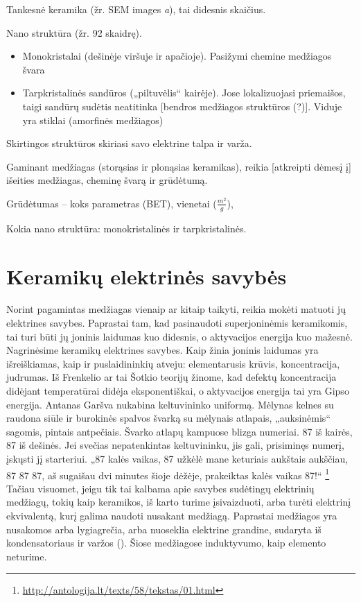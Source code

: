 Tankesnė keramika (žr. SEM images \textit{a}), tai didesnis skaičius.

Nano struktūra (žr. 92 skaidrę).
\begin{itemize}
  \item Monokristalai (dešinėje viršuje ir apačioje). Pasižymi chemine
    medžiagos švara
  \item Tarpkristalinės sandūros („piltuvėlis“ kairėje).
    Jose lokalizuojasi priemaišos, taigi sandūrų sudėtis neatitinka
    [bendros medžiagos struktūros (?)]. Viduje yra stiklai (amorfinės
    medžiagos)
\end{itemize}
Skirtingos struktūros skiriasi savo elektrine talpa ir varža.

\begin{remember}
  \item Gaminant medžiagas (storąsias ir plonąsias keramikas), reikia
    [atkreipti dėmesį į] išeities medžiagas, cheminę švarą ir grūdėtumą.
  \item Grūdėtumas – koks parametras (BET), vienetai ($\frac{m^2}{g}$),
  \item Kokia nano struktūra: monokristalinės ir tarpkristalinės.
\end{remember}

\section{Keramikų elektrinės savybės}


Norint pagamintas medžiagas vienaip ar kitaip taikyti, reikia mokėti
matuoti jų elektrines savybes. Paprastai tam, kad pasinaudoti
superjoninėmis keramikomis, tai turi būti jų joninis laidumas
kuo didesnis, o aktyvacijos energija kuo mažesnė. Nagrinėsime keramikų
elektrines savybes. Kaip žinia joninis laidumas yra išreiškiamas,
kaip ir puslaidininkių atveju: elementarusis krūvis, koncentracija,
judrumas. Iš Frenkelio ar tai Šotkio teorijų žinome, kad defektų
koncentracija didėjant temperatūrai didėja eksponentiškai, o aktyvacijos
energija tai yra Gipso energija.
  {Antanas Garšva nukabina keltuvininko uniformą. Mėlynas kelnes su
  raudona siūle ir burokinės spalvos švarką su mėlynais atlapais,
  „auksinėmis“ sagomis, pintais antpečiais. Švarko atlapų kampuose
  blizga numeriai. 87 iš kairės, 87 iš dešinės. Jei svečias
  nepatenkintas keltuvininku, jis gali, prisiminęs numerį, įskųsti jį
  starteriui. „87 kalės vaikas, 87 užkėlė mane keturiais aukštais
  aukščiau, 87 87 87, aš sugaišau dvi minutes šioje dėžėje,
  prakeiktas kalės vaikas 87!“}%
\footnote{\url{http://antologija.lt/texts/58/tekstas/01.html}}
Tačiau visuomet, jeigu tik tai kalbama apie savybes sudėtingų
elektrinių medžiagų, tokių kaip keramikos, iš karto turime
įsivaizduoti, arba turėti elektrinį ekvivalentą, kurį galima
naudoti nusakant medžiagą. Paprastai medžiagos yra nusakomos arba
lygiagrečia, arba nuoseklia elektrine grandine, sudaryta iš
kondensatoriaus ir varžos (). Šiose medžiagose induktyvumo,
kaip elemento neturime.

